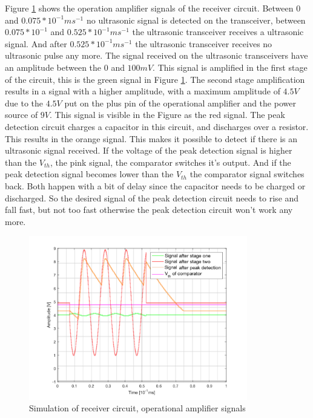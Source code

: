 Figure \ref{fig:sim_receive} shows the operation amplifier signals of the receiver circuit. Between 0 and $0.075*10^{-1}ms^{-1}$ no ultrasonic signal is detected on the transceiver, between $0.075*10^{-1}$ and $0.525*10^{-1}ms^{-1}$ the ultrasonic transceiver receives a ultrasonic signal. And after $0.525*10^{-1}ms^{-1}$ the ultrasonic transceiver receives no ultrasonic pulse any more.
The signal received on the ultrasonic transceivers have an amplitude between the 0 and $100mV$. This signal is amplified in the first stage of the circuit, this is the green signal in Figure \ref{fig:sim_receive}. The second stage amplification results in a signal with a higher amplitude, with a maximum amplitude of $4.5V$ due to the $4.5V$ put on the plus pin of the operational amplifier and the power source of $9V$. This signal is visible in the Figure as the red signal.
The peak detection circuit charges a capacitor in this circuit, and discharges over a resistor. This results in the orange signal. This makes it possible to detect if there is an ultrasonic signal received. If the voltage of the peak detection signal is higher than the $V_{th}$, the pink signal, the comparator switches it's output. And if the peak detection signal becomes lower than the $V_{th}$ the comparator signal switches back. Both happen with a bit of delay since the capacitor needs to be charged or discharged. So the desired signal of the peak detection circuit needs to rise and fall fast, but not too fast otherwise the peak detection circuit won't work any more.\\

\begin{figure}[H]
\centering
\includegraphics[width=0.85\textwidth]{Figures/receiver_simulations.PNG}
\caption{Simulation of receiver circuit, operational amplifier signals}
\label{fig:sim_receive}
\end{figure}

